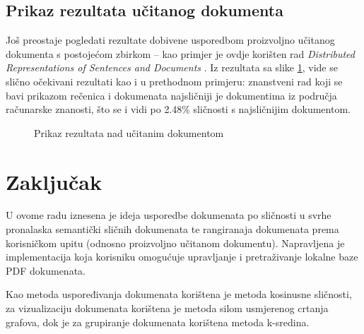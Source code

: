 \documentclass[times, utf8, zavrsni, numeric]{fer}
\begin{document}
\section{Prikaz rezultata učitanog dokumenta}

Još preostaje pogledati rezultate dobivene usporedbom proizvoljno učitanog dokumenta s postojećom zbirkom -- kao primjer je ovdje korišten rad \textit{Distributed Representations of Sentences and Documents} \cite{le2014distributed}. Iz rezultata sa slike \ref{img:document_query}, vide se slično očekivani rezultati kao i u prethodnom primjeru: znanstveni rad koji se bavi prikazom rečenica i dokumenata najsličniji je dokumentima iz područja računarske znanosti, što se i vidi po 2.48\% sličnosti s najsličnijim dokumentom.

\begin{figure}
\caption{Prikaz rezultata nad učitanim dokumentom}
\label{img:document_query}
\end{figure}

\chapter{Zaključak}
U ovome radu iznesena je ideja usporedbe dokumenata po sličnosti u svrhe pronalaska semantički sličnih dokumenata te rangiranaja dokumenata prema korisničkom upitu (odnosno proizvoljno učitanom dokumentu). Napravljena je implementacija koja korisniku omogućuje upravljanje i pretraživanje lokalne baze PDF dokumenata.

Kao metoda uspoređivanja dokumenata korištena je metoda kosinusne sličnosti, za vizualizaciju dokumenata korištena je metoda silom usmjerenog crtanja grafova, dok je za grupiranje dokumenata korištena metoda k-sredina.
\end{document}
